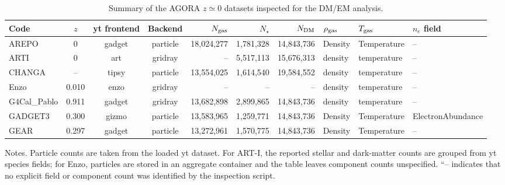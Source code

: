 \begin{table}
\centering
\caption{Summary of the AGORA $z\simeq0$ datasets inspected for the DM/EM analysis.}
\label{tab:agora_dataset_inspection}
\begin{threeparttable}
\begin{tabular}{lcccrrrlll}
\toprule
Code & $z$ & yt frontend & Backend & $N_{\rm gas}$ & $N_\star$ & $N_{\rm DM}$ & $\rho_{\rm gas}$ & $T_{\rm gas}$ & $n_e$ field \\
\midrule
AREPO & 0 & gadget & particle & 18,024,277 & 1,781,328 & 14,843,736 & Density & Temperature & -- \\
ARTI & 0 & art & gridray & -- & 5,517,113 & 15,676,313 & density & temperature & -- \\
CHANGA & -- & tipsy & particle & 13,554,025 & 1,614,540 & 19,584,552 & density & temperature & -- \\
Enzo & 0.010 & enzo & gridray & -- & -- & -- & density & temperature & -- \\
G4Cal\_Pablo & 0.911 & gadget & gridray & 13,682,898 & 2,899,865 & 14,843,736 & density & temperature & -- \\
GADGET3 & 0.300 & gizmo & particle & 13,583,965 & 1,259,771 & 14,843,736 & Density & Temperature & ElectronAbundance \\
GEAR & 0.297 & gadget & particle & 13,272,961 & 1,570,775 & 14,843,736 & Density & Temperature & -- \\
\bottomrule
\end{tabular}
\begin{tablenotes}
\footnotesize
\item Notes. Particle counts are taken from the loaded yt dataset. For ART-I, the reported stellar and dark-matter counts are grouped from yt species fields; for Enzo, particles are stored in an aggregate container and the table leaves component counts unspecified. ``-- indicates that no explicit field or component count was identified by the inspection script.
\end{tablenotes}
\end{threeparttable}
\end{table}
